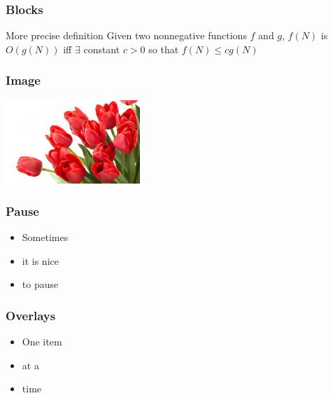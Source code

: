 \documentclass{beamer}
\begin{document}
\begin{frame}
  \frametitle{Blocks}
    \begin{exampleblock}{More precise definition}
    Given two nonnegative functions $f$ and $g$, $f(N)$ is  $O(g(N))$ iff $\exists$ constant $c > 0$ so that $f(N) \leq c g(N)$
    \end{exampleblock}
\end{frame}
\begin{frame}[label=Flower]
  \frametitle{Image}
    \begin{center}
        \includegraphics[width=2in]{images/flower.jpeg}
    \end{center}
    \hyperlink{Overlays}{}
\end{frame}
\begin{frame}
  \frametitle{Pause}
  \pause
 	\begin{itemize}
        \item Sometimes
        \pause
        \item it is nice
        \pause
        \item to pause
    \end{itemize}
\end{frame}
\begin{frame}[label=Overlays]
  \frametitle{Overlays}

    \begin{itemize}
        \item<1-> One item
        \item<2-> at a 
        \item<3-> time
    \end{itemize}
    \hyperlink{Flower}{}
\end{frame}
\end{document}

